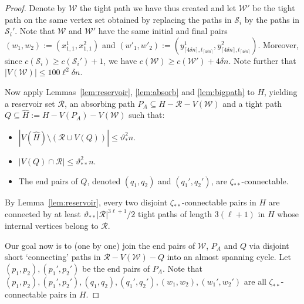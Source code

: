 \documentclass[A4paper,12pt]{article}
\theoremstyle{definition}
\begin{document}
\begin{proof}[Proof]
     Denote by $\mathcal{W}$ the tight path we have thus created and let $\mathcal{W}'$ be the tight path on the same vertex set obtained by replacing the paths in $\mathcal{S}_i$ by the paths in $\mathcal{S}_i'$. Note that $\mathcal{W}$ and $\mathcal{W}'$ have the same initial and final pairs
     $(w_1, w_2) := (x^1_{1,1}, x^2_{1,1})$ and $(w'_1, w'_2) := (y^1_{ \lceil 4 \delta n \rceil, t_{ \lceil 4 \delta n \rceil}}, y^2_{ \lceil 4 \delta n \rceil, t_{ \lceil 4 \delta n \rceil}})$. Moreover, since $c(\mathcal{S}_i) \ge c(\mathcal{S}_i') + 1$, we have $c(\mathcal{W}) \geq c(\mathcal{W}') + 4\delta n$. Note further that $|V(\mathcal{W})| \leq 100\ell^2 \delta n$. 
     
    Now apply Lemmas~\ref{lem:reservoir}, \ref{lem:absorb} and \ref{lem:bigpath} to $H$, yielding a reservoir set $\mathcal{R}$, an absorbing path $P_A \subseteq H - \mathcal{R} - V(\mathcal{W})$ and a tight path $Q \subseteq \hat{H} := H  - V(P_A) - V(\mathcal{W})$ such that: 
 
     \begin{itemize}
         \item[(i)] $|V(\hat{H})\setminus (\mathcal{R} \cup V(Q))| \leq \vartheta_{*}^2 n$.
         \item[(ii)] $|V(Q) \cap \mathcal{R}| \leq \vartheta_{**}^2 n$.
         \item[(iii)] The end pairs of $Q$, denoted $(q_1,q_2)$ and $(q_1',q_2')$, are $\zeta_{**}$-connectable.
     \end{itemize}
     
     By Lemma~\ref{lem:reservoir}, every two disjoint $\zeta_{**}$-connectable pairs in $H$ are connected by at least $\vartheta_{**}|\mathcal{R}|^{3\ell + 1}/2$ tight paths of length $3(\ell + 1)$ in $H$ whose internal vertices belong to $\mathcal{R}$.

     Our goal now is to (one by one) join the end pairs of $\mathcal{W}$, $P_A$ and $Q$ via disjoint short  `connecting' paths in $\mathcal{R} - V(\mathcal{W}) - Q$ into an almost spanning cycle. 
     Let $(p_1,p_2), (p_1',p_2')$ be the end pairs of $P_A$. Note that $(p_1,p_2),(p_1',p_2'),(q_1,q_2),(q_1',q_2'),(w_1,w_2),(w_1',w_2')$ are all $\zeta_{**}$-connectable pairs in $H$. 
     

\end{proof}
\end{document}
